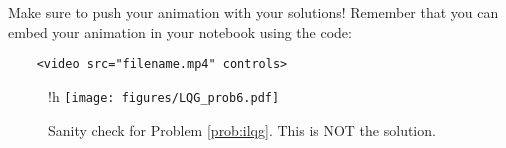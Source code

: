 \begin{warn}
Make sure to push your animation with your solutions! Remember that you can embed your animation in your notebook using the code:
\begin{lstlisting}
    <video src="filename.mp4" controls>
\end{lstlisting}
\end{warn}

\begin{figure}{!h}
    \centering
    \texttt{[image: figures/LQG\_prob6.pdf]}
    \caption{Sanity check for Problem \ref{prob:ilqg}.
    This is NOT the solution.}
    \label{fig:prob-ilqg}
\end{figure}
